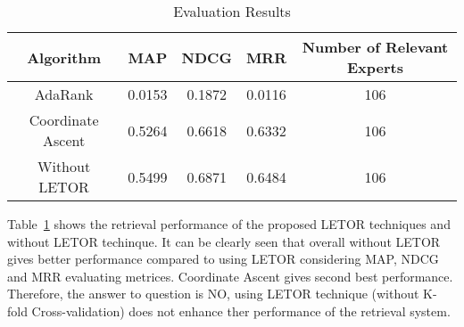 \begin{table}
\centering
\begin{tabular}{|c|c|c|c|c|}
\hline \textbf{Algorithm} & \textbf{MAP} & \textbf{NDCG} & \textbf{MRR} & \textbf{Number of Relevant Experts}\\
\hline AdaRank & 0.0153 & 0.1872 & 0.0116 & 106\\
\hline Coordinate Ascent & 0.5264 & 0.6618 & 0.6332 & 106 \\
\hline Without LETOR  & 0.5499 & 0.6871 & 0.6484 & 106\\ 
\hline
\end{tabular}
\caption{Evaluation Results} \label{table:evaluationresult}
\end{table}

Table~\ref{table:evaluationresult} shows the retrieval performance of the proposed LETOR techniques and without LETOR techinque. It can be clearly seen
that overall without LETOR gives better performance compared to using LETOR considering MAP, NDCG and MRR evaluating metrices. Coordinate Ascent gives second best 
performance. Therefore, the answer to question is NO, using LETOR technique (without K-fold Cross-validation) does not enhance ther performance of the retrieval system.

